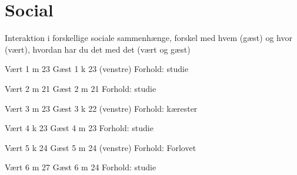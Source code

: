 \section{Social}
\label{TestresultaterSocialAcceptSocial}
%
Interaktion i forskellige sociale sammenhænge, forskel med hvem (gæst) og hvor (vært), hvordan har du det med det (vært og gæst) 


Vært 1 m 23
Gæst 1 k 23 (venstre)
Forhold: studie

Vært 2 m 21
Gæst 2 m 21
Forhold: studie

Vært 3 m 23
Gæst 3 k 22 (venstre)
Forhold: kærester

Vært 4 k 23
Gæst 4 m 23
Forhold: studie

Vært 5 k 24
Gæst 5 m 24 (venstre) 
Forhold: Forlovet

Vært 6 m 27 
Gæst 6 m 24
Forhold: studie
